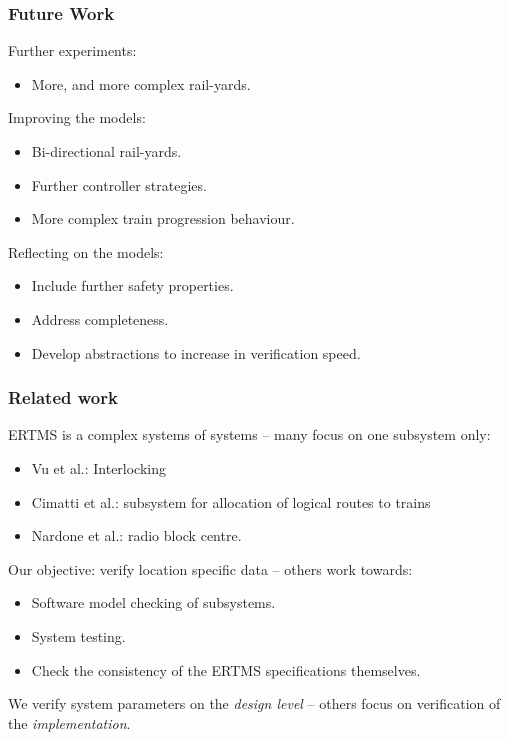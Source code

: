\documentclass{beamer}
\begin{document}
\begin{frame}
\frametitle{Future Work}

Further experiments:
\begin{itemize}
\item More, and more complex rail-yards.
\end{itemize}

Improving the models:
\begin{itemize}
\item Bi-directional rail-yards.
\item Further controller strategies. 
\item More complex train progression behaviour.
\end{itemize}

Reflecting on the models:
\begin{itemize}
\item Include further safety properties.
\item Address completeness.
\item Develop abstractions to increase in verification speed.
\end{itemize}

\end{frame}

\begin{frame}
\frametitle{Related work}

ERTMS is a complex systems of systems -- many focus on one subsystem only:
\begin{itemize}
\item
Vu et al.: Interlocking 
\item
Cimatti et al.: subsystem for allocation of logical routes to trains
\item
Nardone et al.: radio block centre.
\end{itemize}

Our objective: verify location specific data -- others work towards:
\begin{itemize}
\item Software model checking of subsystems.
\item System testing.
\item Check the consistency of the ERTMS specifications themselves.
\end{itemize}

We verify system parameters on the \emph{design level} -- others focus on
verification of the \emph{implementation}.

\end{frame}
\end{document}
